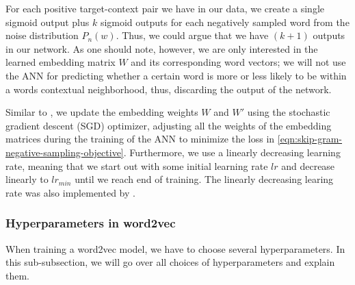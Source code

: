 For each positive target-context pair we have in our data, we create a single sigmoid output plus $k$ sigmoid outputs for each negatively sampled word from the noise distribution $P_n(w)$. Thus, we could argue that we have $(k + 1)$ outputs in our network. As one should note, however, we are only interested in the learned embedding matrix $W$ and its corresponding word vectors; we will not use the ANN for predicting whether a certain word is more or less likely to be within a words contextual neighborhood, thus, discarding the output of the network.

Similar to \cite{mikolov2013a}, we update the embedding weights $W$ and $W'$ using the stochastic gradient descent (SGD) optimizer, adjusting all the weights of the embedding matrices during the training of the ANN to minimize the loss in \cref{eqn:skip-gram-negative-sampling-objective}. Furthermore, we use a linearly decreasing learning rate, meaning that we start out with some initial learning rate $lr$ and decrease linearly to $lr_{min}$ until we reach end of training. The linearly decreasing learing rate was also implemented by \cite{mikolov2013a}.

\subsubsection{Hyperparameters in word2vec}
When training a word2vec model, we have to choose several hyperparameters. In this sub-subsection, we will go over all choices of hyperparameters and explain them.

